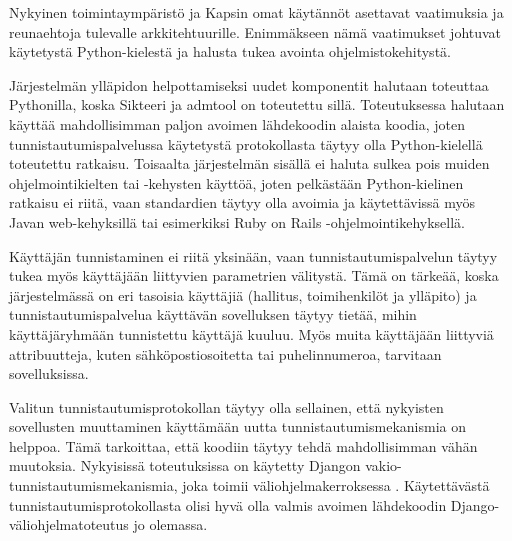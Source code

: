 Nykyinen toimintaympäristö ja Kapsin omat käytännöt asettavat vaatimuksia ja reunaehtoja tulevalle arkkitehtuurille. Enimmäkseen nämä vaatimukset johtuvat käytetystä Python-kielestä ja halusta tukea avointa ohjelmistokehitystä.

Järjestelmän ylläpidon helpottamiseksi uudet komponentit halutaan toteuttaa Pythonilla, koska Sikteeri ja admtool on toteutettu sillä. Toteutuksessa halutaan käyttää mahdollisimman paljon avoimen lähdekoodin alaista koodia, joten tunnistautumispalvelussa käytetystä protokollasta täytyy olla Python-kielellä toteutettu ratkaisu. Toisaalta järjestelmän sisällä ei haluta sulkea pois muiden ohjelmointikielten tai -kehysten käyttöä, joten pelkästään Python-kielinen ratkaisu ei riitä, vaan standardien täytyy olla avoimia ja käytettävissä myös Javan web-kehyksillä tai esimerkiksi Ruby on Rails -ohjelmointikehyksellä.

Käyttäjän tunnistaminen ei riitä yksinään, vaan tunnistautumispalvelun täytyy tukea myös käyttäjään liittyvien parametrien välitystä. Tämä on tärkeää, koska järjestelmässä on eri tasoisia käyttäjiä (hallitus, toimihenkilöt ja ylläpito) ja tunnistautumispalvelua käyttävän sovelluksen täytyy tietää, mihin käyttäjäryhmään tunnistettu käyttäjä kuuluu. Myös muita käyttäjään liittyviä attribuutteja, kuten sähköpostiosoitetta tai puhelinnumeroa, tarvitaan sovelluksissa.

Valitun tunnistautumisprotokollan täytyy olla sellainen, että nykyisten sovellusten muuttaminen käyttämään uutta tunnistautumismekanismia on helppoa. Tämä tarkoittaa, että koodiin täytyy tehdä mahdollisimman vähän muutoksia. Nykyisissä toteutuksissa on käytetty Djangon vakio-tunnistautumismekanismia, joka toimii väliohjelmakerroksessa \cite{django}. Käytettävästä tunnistautumisprotokollasta olisi hyvä olla valmis avoimen lähdekoodin Django-väliohjelmatoteutus jo olemassa.